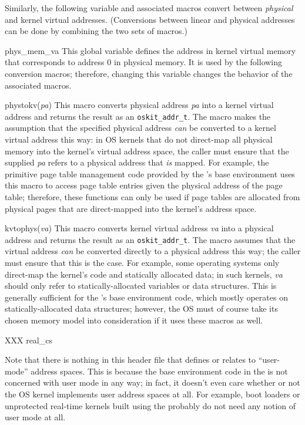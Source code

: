 \begin{apidesc}
	Similarly, the following variable and associated macros
	convert between \emph{physical} and kernel virtual addresses.
	(Conversions between linear and physical addresses can be done
	by combining the two sets of macros.)
	\begin{csymlist}
	\item[phys_mem_va]			\label{phys-mem-va}
		This global variable defines
		the address in kernel virtual memory
		that corresponds to address 0 in physical memory.
		It is used by the following conversion macros;
		therefore, changing this variable
		changes the behavior of the associated macros.
	\item[phystokv(\emph{pa})]		\label{phystokv}
		This macro converts physical address \emph{pa}
		into a kernel virtual address
		and returns the result as an {\tt oskit_addr_t}.
		The macro makes the assumption
		that the specified physical address
		\emph{can} be converted to a kernel virtual address this way:
		in OS kernels that do not direct-map all physical memory
		into the kernel's virtual address space,
		the caller must ensure that the supplied \emph{pa}
		refers to a physical address that \emph{is} mapped.
		For example, the primitive page table management code
		provided by the \oskit{}'s base environment
		uses this macro to access page table entries
		given the physical address of the page table;
		therefore, these functions can only be used
		if page tables are allocated from physical pages
		that are direct-mapped into the kernel's address space.
	\item[kvtophys(\emph{va})]	
		This macro converts kernel virtual address \emph{va}
		into a physical address
		and returns the result as an {\tt oskit_addr_t}.
		The macro assumes that the virtual address
		\emph{can} be converted directly to a physical address this way;
		the caller must ensure that this is the case.
		For example, some operating systems only direct-map
		the kernel's code and statically allocated data;
		in such kernels, \emph{va} should only refer to
		statically-allocated variables or data structures.
		This is generally sufficient
		for the \oskit{}'s base environment code,
		which mostly operates on statically-allocated data structures;
		however, the OS must of course take its chosen memory model
		into consideration if it uses these macros as well.
	\end{csymlist}

	XXX real_cs

	Note that there is nothing in this header file
	that defines or relates to ``user-mode'' address spaces.
	This is because the base environment code in the \oskit{}
	is not concerned with user mode in any way;
	in fact, it doesn't even care
	whether or not the OS kernel implements user address spaces at all.
	For example, boot loaders or unprotected real-time kernels
	built using the \oskit{}
	probably do not need any notion of user mode at all.
\end{apidesc}

